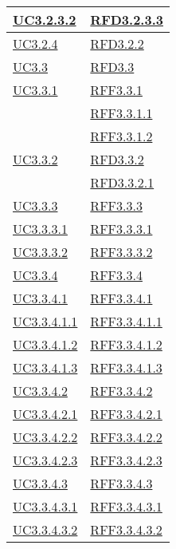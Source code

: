 \begin{longtable}{|>{\centering}m{5cm}|m{5cm}<{\centering}|}
\hyperref[UC3.2.3.2]{UC3.2.3.2} & \hyperlink{RFD3.2.3.3}{RFD3.2.3.3}\\ \hline
\hyperref[UC3.2.4]{UC3.2.4} & \hyperlink{RFD3.2.2}{RFD3.2.2}\\ \hline
\hyperref[UC3.3]{UC3.3} & \hyperlink{RFD3.3}{RFD3.3}\\ \hline
\hyperref[UC3.3.1]{UC3.3.1} & \hyperlink{RFF3.3.1}{RFF3.3.1}\\
& \hyperlink{RFF3.3.1.1}{RFF3.3.1.1}\\
& \hyperlink{RFF3.3.1.2}{RFF3.3.1.2}\\ \hline
\hyperref[UC3.3.2]{UC3.3.2} & \hyperlink{RFD3.3.2}{RFD3.3.2}\\
& \hyperlink{RFD3.3.2.1}{RFD3.3.2.1}\\ \hline
\hyperref[UC3.3.3]{UC3.3.3} & \hyperlink{RFF3.3.3}{RFF3.3.3}\\ \hline
\hyperref[UC3.3.3.1]{UC3.3.3.1} & \hyperlink{RFF3.3.3.1}{RFF3.3.3.1}\\ \hline
\hyperref[UC3.3.3.2]{UC3.3.3.2} & \hyperlink{RFF3.3.3.2}{RFF3.3.3.2}\\ \hline
\hyperref[UC3.3.4]{UC3.3.4} & \hyperlink{RFF3.3.4}{RFF3.3.4}\\ \hline
\hyperref[UC3.3.4.1]{UC3.3.4.1} & \hyperlink{RFF3.3.4.1}{RFF3.3.4.1}\\ \hline
\hyperref[UC3.3.4.1.1]{UC3.3.4.1.1} & \hyperlink{RFF3.3.4.1.1}{RFF3.3.4.1.1}\\ \hline
\hyperref[UC3.3.4.1.2]{UC3.3.4.1.2} & \hyperlink{RFF3.3.4.1.2}{RFF3.3.4.1.2}\\ \hline
\hyperref[UC3.3.4.1.3]{UC3.3.4.1.3} & \hyperlink{RFF3.3.4.1.3}{RFF3.3.4.1.3}\\ \hline
\hyperref[UC3.3.4.2]{UC3.3.4.2} & \hyperlink{RFF3.3.4.2}{RFF3.3.4.2}\\ \hline
\hyperref[UC3.3.4.2.1]{UC3.3.4.2.1} & \hyperlink{RFF3.3.4.2.1}{RFF3.3.4.2.1}\\ \hline
\hyperref[UC3.3.4.2.2]{UC3.3.4.2.2} & \hyperlink{RFF3.3.4.2.2}{RFF3.3.4.2.2}\\ \hline
\hyperref[UC3.3.4.2.3]{UC3.3.4.2.3} & \hyperlink{RFF3.3.4.2.3}{RFF3.3.4.2.3}\\ \hline
\hyperref[UC3.3.4.3]{UC3.3.4.3} & \hyperlink{RFF3.3.4.3}{RFF3.3.4.3}\\ \hline
\hyperref[UC3.3.4.3.1]{UC3.3.4.3.1} & \hyperlink{RFF3.3.4.3.1}{RFF3.3.4.3.1}\\ \hline
\hyperref[UC3.3.4.3.2]{UC3.3.4.3.2} & \hyperlink{RFF3.3.4.3.2}{RFF3.3.4.3.2}\\ \hline

\end{longtable}
